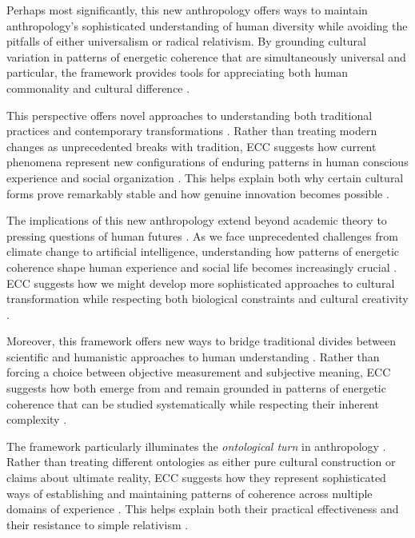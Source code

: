 Perhaps most significantly, this new anthropology offers ways to maintain anthropology's sophisticated understanding of human diversity \cite{moore2011still, strathern2004partial} while avoiding the pitfalls of either universalism or radical relativism. By grounding cultural variation in patterns of energetic coherence that are simultaneously universal and particular, the framework provides tools for appreciating both human commonality and cultural difference \cite{viveiros2014cannibal}.

This perspective offers novel approaches to understanding both traditional practices and contemporary transformations \cite{tsing2015mushroom, ingold2011being}. Rather than treating modern changes as unprecedented breaks with tradition, ECC suggests how current phenomena represent new configurations of enduring patterns in human conscious experience and social organization \cite{latour1993modern}. This helps explain both why certain cultural forms prove remarkably stable and how genuine innovation becomes possible \cite{wagner2016invention, bateson2000steps}.

The implications of this new anthropology extend beyond academic theory to pressing questions of human futures \cite{haraway2016staying, latour2017facing}. As we face unprecedented challenges from climate change to artificial intelligence, understanding how patterns of energetic coherence shape human experience and social life becomes increasingly crucial \cite{tsing2015mushroom}. ECC suggests how we might develop more sophisticated approaches to cultural transformation while respecting both biological constraints and cultural creativity \cite{ingold2013making, haraway2003companion}.

Moreover, this framework offers new ways to bridge traditional divides between scientific and humanistic approaches to human understanding \cite{stengers2018another, latour1999pandora}. Rather than forcing a choice between objective measurement and subjective meaning, ECC suggests how both emerge from and remain grounded in patterns of energetic coherence that can be studied systematically while respecting their inherent complexity \cite{jackson1996things, laughlin1992brain}.

The framework particularly illuminates the \textit{ontological turn} in anthropology \cite{bessire2014ontological, viveiros2014cannibal}. Rather than treating different ontologies as either pure cultural construction or claims about ultimate reality, ECC suggests how they represent sophisticated ways of establishing and maintaining patterns of coherence across multiple domains of experience \cite{kohn2013how}. This helps explain both their practical effectiveness and their resistance to simple relativism \cite{strathern1980nature}.

